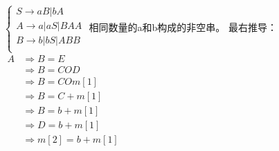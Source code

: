 \documentclass{ctexart}
\newcommand*{\tto}[0]{\Rightarrow}
\begin{document}
\begin{outline}
        \2[(4)] $\begin{cases}
            S \to aB | bA \\
            A \to a | aS | BAA \\
            B \to b | bS | ABB \\
        \end{cases}$
        相同数量的a和b构成的非空串。
    \1[16.]
        \2[] 最右推导： \\
        $\begin{aligned}
            A &\tto B = E \\
              &\tto B = COD  \\
              &\tto B = COm[1]  \\
              &\tto B = C+m[1]  \\
              &\tto B = b+m[1]  \\
              &\tto D=b+m[1] \\
              &\tto m[2]=b+m[1]
        \end{aligned}$ 


\end{outline}
\end{document}
